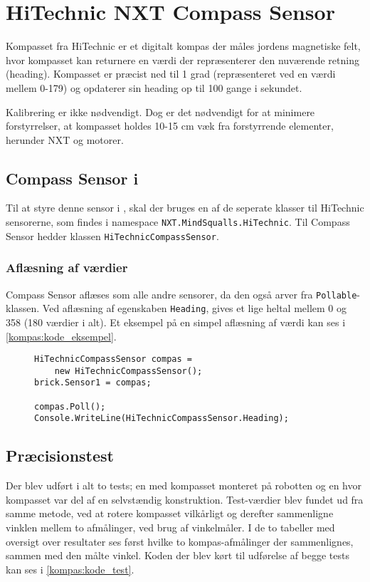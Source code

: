 \section{HiTechnic NXT Compass Sensor}
Kompasset fra HiTechnic er et digitalt kompas der måles jordens magnetiske felt, hvor kompasset kan returnere en værdi der repræsenterer den nuværende retning (heading).
Kompasset er præcist ned til 1 grad (repræsenteret ved en værdi mellem 0-179) og opdaterer sin heading op til 100 gange i sekundet.

Kalibrering er ikke nødvendigt.
Dog er det nødvendigt for at minimere forstyrrelser, at kompasset holdes 10-15 cm væk fra forstyrrende elementer, herunder \lego NXT og motorer.\cite{hitechnic_compass}

\subsection{Compass Sensor i \mindsqualls}
Til at styre denne sensor i \mindsqualls, skal der bruges en af de seperate klasser til HiTechnic sensorerne, som findes i namespace \lstinline[style=csharp]!NXT.MindSqualls.HiTechnic!.
Til Compass Sensor hedder klassen \lstinline[style=csharp]!HiTechnicCompassSensor!.

\subsubsection{Aflæsning af værdier}
Compass Sensor aflæses som alle andre sensorer, da den også arver fra \lstinline[style=csharp]!Pollable!-klassen.
Ved aflæsning af egenskaben \lstinline[style=csharp]!Heading!, gives et lige heltal mellem 0 og 358 (180 værdier i alt).
Et eksempel på en simpel aflæsning af værdi kan ses i \cref{kompas:kode_eksempel}.

\begin{figure}[h]
\begin{lstlisting}[style=csharpsmall,caption={Et eksempel på brug af Compass Sensor},label=kompas:kode_eksempel,frame=single]
HiTechnicCompassSensor compas =
	new HiTechnicCompassSensor();
brick.Sensor1 = compas;

compas.Poll();
Console.WriteLine(HiTechnicCompassSensor.Heading);
\end{lstlisting}
\end{figure}

\subsection{Præcisionstest}
Der blev udført i alt to tests; en med kompasset monteret på robotten og en hvor kompasset var del af en selvstændig konstruktion.
Test-værdier blev fundet ud fra samme metode, ved at rotere kompasset vilkårligt og derefter sammenligne vinklen mellem to afmålinger, ved brug af vinkelmåler.
I de to tabeller med oversigt over resultater ses først hvilke to kompas-afmålinger der sammenlignes, sammen med den målte vinkel.
Koden der blev kørt til udførelse af begge tests kan ses i \cref{kompas:kode_test}.

